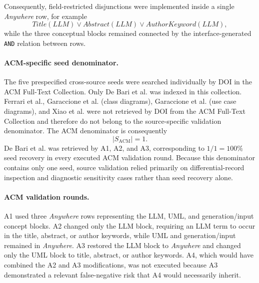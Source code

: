 Consequently, field-restricted disjunctions were implemented inside a single
\emph{Anywhere} row, for example
\[
Title(LLM)\lor Abstract(LLM)\lor AuthorKeyword(LLM),
\]
while the three conceptual blocks remained connected by the interface-generated
\texttt{AND} relation between rows.

\paragraph{ACM-specific seed denominator.}
The five prespecified cross-source seeds were searched individually by DOI in
the ACM Full-Text Collection. Only De Bari et al.
\cite{DeBari2024UML} was indexed in this collection. Ferrari et al.,
Garaccione et al. (class diagrams), Garaccione et al. (use case diagrams), and
Xiao et al. were not retrieved by DOI from the ACM Full-Text Collection and
therefore do not belong to the source-specific validation denominator. The ACM
denominator is consequently
\[
|S_{\mathrm{ACM}}|=1.
\]
De Bari et al. was retrieved by A1, A2, and A3, corresponding to
\(1/1=100\%\) seed recovery in every executed ACM validation round. Because
this denominator contains only one seed, source validation relied primarily on
differential-record inspection and diagnostic sensitivity cases rather than
seed recovery alone.

\paragraph{ACM validation rounds.}
A1 used three \emph{Anywhere} rows representing the LLM, UML, and
generation/input concept blocks. A2 changed only the LLM block, requiring an
LLM term to occur in the title, abstract, or author keywords, while UML and
generation/input remained in \emph{Anywhere}. A3 restored the LLM block to
\emph{Anywhere} and changed only the UML block to title, abstract, or author
keywords. A4, which would have combined the A2 and A3 modifications, was not
executed because A3 demonstrated a relevant false-negative risk that A4 would
necessarily inherit.

